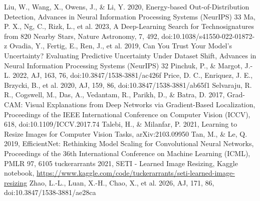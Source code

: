 \documentclass[11pt]{article}
\begin{document}
\begin{thebibliography}{}
 Liu, W., Wang, X., Owens, J., \& Li, Y. 2020, Energy-based Out-of-Distribution Detection, Advances in Neural Information Processing Systems (NeurIPS) 33
 Ma, P. X., Ng, C., Rizk, L., et al. 2023, A Deep-Learning Search for Technosignatures from 820 Nearby Stars, Nature Astronomy, 7, 492, doi:10.1038/s41550-022-01872-z
 Ovadia, Y., Fertig, E., Ren, J., et al. 2019, Can You Trust Your Model's Uncertainty? Evaluating Predictive Uncertainty Under Dataset Shift, Advances in Neural Information Processing Systems (NeurIPS) 32
 Pinchuk, P., \& Margot, J.-L. 2022, AJ, 163, 76, doi:10.3847/1538-3881/ac426f
 Price, D. C., Enriquez, J. E., Brzycki, B., et al. 2020, AJ, 159, 86, doi:10.3847/1538-3881/ab65f1
 Selvaraju, R. R., Cogswell, M., Das, A., Vedantam, R., Parikh, D., \& Batra, D. 2017, Grad-CAM: Visual Explanations from Deep Networks via Gradient-Based Localization, Proceedings of the IEEE International Conference on Computer Vision (ICCV), 618, doi:10.1109/ICCV.2017.74
 Talebi, H., \& Milanfar, P. 2021, Learning to Resize Images for Computer Vision Tasks, arXiv:2103.09950
 Tan, M., \& Le, Q. 2019, EfficientNet: Rethinking Model Scaling for Convolutional Neural Networks, Proceedings of the 36th International Conference on Machine Learning (ICML), PMLR 97, 6105
 tuckerarrants 2021, SETI - Learned Image Resizing, Kaggle notebook, \url{https://www.kaggle.com/code/tuckerarrants/seti-learned-image-resizing}
 Zhao, L.-L., Luan, X.-H., Chao, X., et al. 2026, AJ, 171, 86, doi:10.3847/1538-3881/ae28ca
\end{thebibliography}

\appendix
\end{document}
